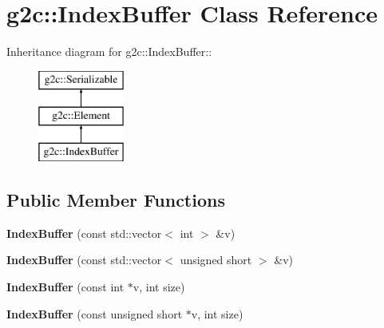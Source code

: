 \hypertarget{classg2c_1_1_index_buffer}{
\section{g2c::IndexBuffer Class Reference}
\label{classg2c_1_1_index_buffer}
}
Inheritance diagram for g2c::IndexBuffer::\begin{figure}[H]
\begin{center}
\leavevmode
\includegraphics[height=3cm]{classg2c_1_1_index_buffer}
\end{center}
\end{figure}
\subsection*{Public Member Functions}
\begin{DoxyCompactItemize}
\item 
\hypertarget{classg2c_1_1_index_buffer_aa311924a9d7de1e0f3990691d157faea}{
{\bfseries IndexBuffer} (const std::vector$<$ int $>$ \&v)}
\label{classg2c_1_1_index_buffer_aa311924a9d7de1e0f3990691d157faea}

\item 
\hypertarget{classg2c_1_1_index_buffer_aafb41457cb70feda11f3f43bbdc13535}{
{\bfseries IndexBuffer} (const std::vector$<$ unsigned short $>$ \&v)}
\label{classg2c_1_1_index_buffer_aafb41457cb70feda11f3f43bbdc13535}

\item 
\hypertarget{classg2c_1_1_index_buffer_a307318d26def8baeabb6b5756fafd3e7}{
{\bfseries IndexBuffer} (const int $\ast$v, int size)}
\label{classg2c_1_1_index_buffer_a307318d26def8baeabb6b5756fafd3e7}

\item 
\hypertarget{classg2c_1_1_index_buffer_a73cb82148ae19088e0e93b90190bded9}{
{\bfseries IndexBuffer} (const unsigned short $\ast$v, int size)}
\label{classg2c_1_1_index_buffer_a73cb82148ae19088e0e93b90190bded9}

\end{DoxyCompactItemize}
